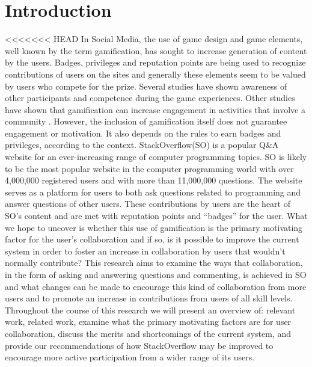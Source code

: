 \documentclass{sigchi}
\begin{document}

 

\section{Introduction}
<<<<<<< HEAD
In Social Media, the use of game design and game elements, well known by the term gamification, has sought to increase generation of content by the users. Badges, privileges and reputation points are being used to recognize contributions of users on the sites and generally these elements seem to be valued by users who compete for the prize. Several studies have shown awareness of other participants and competence during the game experiences\cite{Rughinis}. Other studies have shown that gamification can increase engagement in activities that involve a community \cite{Marder}. However, the inclusion of gamification itself does not guarantee engagement or motivation. It also depends on the rules to earn badges and privileges, according to the context\cite{Deterding}.
StackOverflow(SO) is a popular Q&A website for an ever-increasing range of computer programming topics. SO is likely to be the most popular website in the computer programming world with over 4,000,000 registered users and with more than 11,000,000 questions. The website serves as a platform for users to both ask questions related to programming and answer questions of other users. These contributions by users are the heart of SO's content and are met with reputation points and “badges” for the user. What we hope to uncover is whether this use of gamification is the primary motivating factor for the user’s collaboration and if so, is it possible to improve the current system in order to foster an increase in collaboration by users that wouldn’t normally contribute? 
This research aims to examine the ways that collaboration, in the form of asking and answering questions and commenting, is achieved in SO and what changes can be made to encourage this kind of collaboration from more users and to promote an increase in contributions from users of all skill levels. 
Throughout the course of this research we will present an overview of: relevant work, related work, examine what the primary motivating factors are for user collaboration, discuss the merits and shortcomings of the current system, and provide our recommendations of how StackOverflow may be improved to encourage more active participation from a wider range of its users. 
\end{document}
